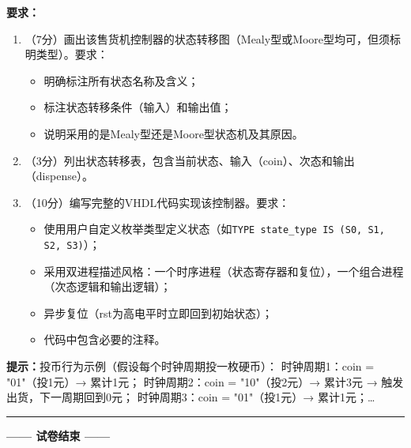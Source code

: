 \textbf{要求：}
\begin{enumerate}[label=(\arabic*)]
  \item （7分）画出该售货机控制器的状态转移图（Mealy型或Moore型均可，但须标明类型）。要求：
  \begin{itemize}
    \item 明确标注所有状态名称及含义；
    \item 标注状态转移条件（输入）和输出值；
    \item 说明采用的是Mealy型还是Moore型状态机及其原因。
  \end{itemize}
  \item （3分）列出状态转移表，包含当前状态、输入（coin）、次态和输出（dispense）。
  \item （10分）编写完整的VHDL代码实现该控制器。要求：
  \begin{itemize}
    \item 使用用户自定义枚举类型定义状态（如\texttt{TYPE state\_type IS (S0, S1, S2, S3)}）；
    \item 采用双进程描述风格：一个时序进程（状态寄存器和复位），一个组合进程（次态逻辑和输出逻辑）；
    \item 异步复位（rst为高电平时立即回到初始状态）；
    \item 代码中包含必要的注释。
  \end{itemize}
\end{enumerate}

\begin{framed}
\textbf{提示：}投币行为示例（假设每个时钟周期投一枚硬币）：
时钟周期1：coin = "01"（投1元）→ 累计1元；
时钟周期2：coin = "10"（投2元）→ 累计3元 → 触发出货，下一周期回到0元；
时钟周期3：coin = "01"（投1元）→ 累计1元；\ldots
\end{framed}

\vspace{0.3cm}

{\centering
\rule{0.8\textwidth}{0.5pt}
\vspace{0.3cm}

\textbf{—— 试卷结束 ——}

\vspace{0.5cm}}

\endinput
